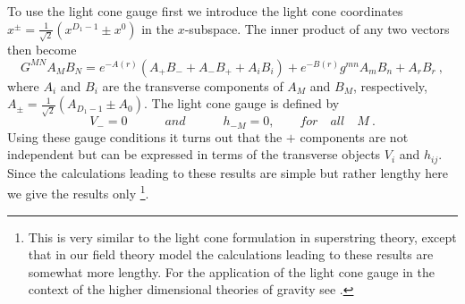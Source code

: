 \documentclass[a4paper,12pt]{article}
\begin{document}
To use the light cone gauge first we introduce the light cone
coordinates $x^{\pm}=\frac{1}{\sqrt{2}}(x^{D_1-1} \pm x^0)$ in the
$x$-subspace. The inner product of any two vectors then become
\begin{equation}
G^{MN} A_M B_N= e^{-A(r)}(A_{+}B_{-} + A_{-}B_{+} + A_i B_i) +
e^{-B(r)}g^{mn}A_m B_n + A_r B_r~,
\end{equation}
where $A_i$ and $B_i$ are the transverse components of $A_M$ and
$B_M$,  respectively, $A_{\pm}=\frac{1}{\sqrt{2}}(A_{D_1-1} \pm
A_0)$. The light cone gauge is defined by
\begin{equation}
V_{-}=0 \quad\quad\quad and \quad\quad\quad h_{-M} = 0,
 \quad\quad for\quad all \quad M~.
\end{equation}
Using these gauge conditions it turns out that the $+$ components are
not independent but can be expressed in terms of the transverse
objects $V_i$ and $h_{ij}$. Since the calculations leading to these
results are  simple but rather lengthy here we give the results only
\footnote{This is very similar to the light cone formulation in
superstring theory, except that in our field theory model the
calculations leading to these results are somewhat more lengthy. For
the application of the light cone gauge in the context of the higher
dimensional theories of gravity see 
\cite{Randjbar-Daemi:1984ap,Randjbar-Daemi:1984fs}.}.
\end{document}
